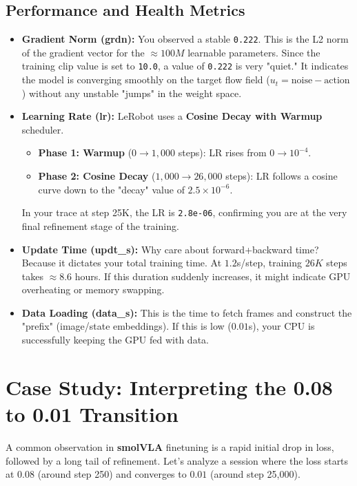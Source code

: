 \documentclass[11pt,a4paper]{article}
\begin{document}
\subsection{Performance and Health Metrics}
\begin{itemize}
    \item \textbf{Gradient Norm (grdn):} You observed a stable \texttt{0.222}. This is the L2 norm of the gradient vector for the $\approx 100M$ learnable parameters. Since the training clip value is set to \texttt{10.0}, a value of \texttt{0.222} is very "quiet." It indicates the model is converging smoothly on the target flow field ($u_t = \text{noise} - \text{action}$) without any unstable "jumps" in the weight space.
    \item \textbf{Learning Rate (lr):} LeRobot uses a \textbf{Cosine Decay with Warmup} scheduler. 
    \begin{itemize}
        \item \textbf{Phase 1: Warmup} ($0 \to 1,000$ steps): LR rises from $0 \to 10^{-4}$.
        \item \textbf{Phase 2: Cosine Decay} ($1,000 \to 26,000$ steps): LR follows a cosine curve down to the "decay" value of $2.5 \times 10^{-6}$.
    \end{itemize}
    In your trace at step 25K, the LR is \texttt{2.8e-06}, confirming you are at the very final refinement stage of the training.
    \item \textbf{Update Time (updt\_s):} Why care about forward+backward time? Because it dictates your total training time. At $1.2$s/step, training $26K$ steps takes $\approx 8.6$ hours. If this duration suddenly increases, it might indicate GPU overheating or memory swapping.
    \item \textbf{Data Loading (data\_s):} This is the time to fetch frames and construct the "prefix" (image/state embeddings). If this is low ($0.01$s), your CPU is successfully keeping the GPU fed with data.
\end{itemize}

\section{Case Study: Interpreting the 0.08 to 0.01 Transition}
A common observation in \textbf{smolVLA} finetuning is a rapid initial drop in loss, followed by a long tail of refinement. Let's analyze a session where the loss starts at $0.08$ (around step 250) and converges to $0.01$ (around step 25,000).
\end{document}
